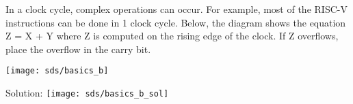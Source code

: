 \begin{blocksection}
\question
In a clock cycle, complex operations can occur.  For example, most of the RISC-V instructions can be done in 1 clock cycle.  Below, the diagram shows the equation Z = X + Y where Z is computed on the rising edge of the clock.  If Z overflows, place the overflow in the carry bit.

\texttt{[image: sds/basics\_b]}
\begin{solution}
Solution:
\texttt{[image: sds/basics\_b\_sol]}
\end{solution}
\end{blocksection}